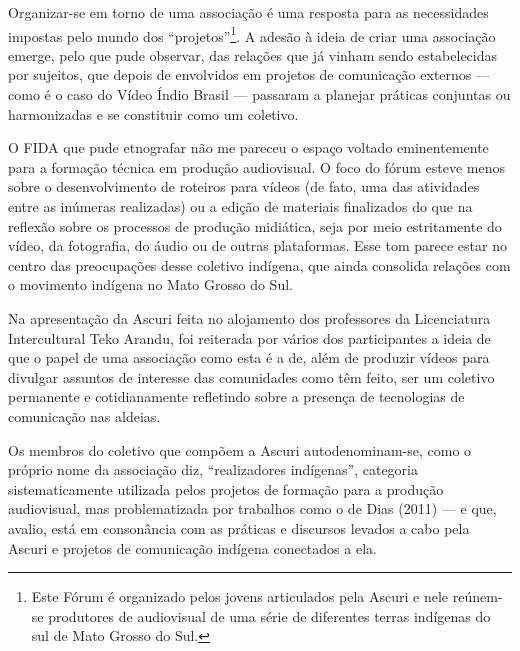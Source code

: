 Organizar-se em torno de uma associação é uma resposta para as
necessidades impostas pelo mundo dos ``projetos''\footnote{Este Fórum é
  organizado pelos jovens articulados pela Ascuri e nele reúnem-se
  produtores de audiovisual de uma série de diferentes terras indígenas
  do sul de Mato Grosso do Sul.}. A adesão à ideia de criar uma
associação emerge, pelo que pude observar, das relações que já vinham
sendo estabelecidas por sujeitos, que depois de envolvidos em projetos
de comunicação externos --- como é o caso do Vídeo Índio Brasil ---
passaram a planejar práticas conjuntas ou harmonizadas e se constituir
como um coletivo.

O FIDA que pude etnografar não me pareceu o espaço voltado eminentemente
para a formação técnica em produção audiovisual. O foco do fórum esteve
menos sobre o desenvolvimento de roteiros para vídeos (de fato, uma das
atividades entre as inúmeras realizadas) ou a edição de materiais
finalizados do que na reflexão sobre os processos de produção midiática,
seja por meio estritamente do vídeo, da fotografia, do áudio ou de
outras plataformas. Esse tom parece estar no centro das preocupações
desse coletivo indígena, que ainda consolida relações com o movimento
indígena no Mato Grosso do Sul.

Na apresentação da Ascuri feita no alojamento dos professores da
Licenciatura Intercultural Teko Arandu, foi reiterada por vários dos
participantes a ideia de que o papel de uma associação como esta é a de,
além de produzir vídeos para divulgar assuntos de interesse das
comunidades como têm feito, ser um coletivo permanente e cotidianamente
refletindo sobre a presença de tecnologias de comunicação nas aldeias.

Os membros do coletivo que compõem a Ascuri autodenominam-se, como o
próprio nome da associação diz, ``realizadores indígenas'', categoria
sistematicamente utilizada pelos projetos de formação para a produção
audiovisual, mas problematizada por trabalhos como o de Dias (2011) ---
e que, avalio, está em consonância com as práticas e discursos levados a
cabo pela Ascuri e projetos de comunicação indígena conectados a ela.

